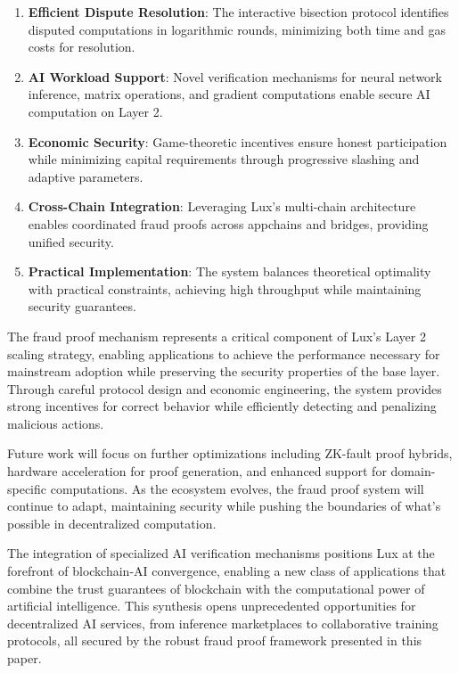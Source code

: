 \documentclass[11pt,a4paper]{article}
\theoremstyle{definition}
\begin{document}
\begin{enumerate}
    \item \textbf{Efficient Dispute Resolution}: The interactive bisection protocol identifies disputed computations in logarithmic rounds, minimizing both time and gas costs for resolution.
    
    \item \textbf{AI Workload Support}: Novel verification mechanisms for neural network inference, matrix operations, and gradient computations enable secure AI computation on Layer 2.
    
    \item \textbf{Economic Security}: Game-theoretic incentives ensure honest participation while minimizing capital requirements through progressive slashing and adaptive parameters.
    
    \item \textbf{Cross-Chain Integration}: Leveraging Lux's multi-chain architecture enables coordinated fraud proofs across appchains and bridges, providing unified security.
    
    \item \textbf{Practical Implementation}: The system balances theoretical optimality with practical constraints, achieving high throughput while maintaining security guarantees.
\end{enumerate}

The fraud proof mechanism represents a critical component of Lux's Layer 2 scaling strategy, enabling applications to achieve the performance necessary for mainstream adoption while preserving the security properties of the base layer. Through careful protocol design and economic engineering, the system provides strong incentives for correct behavior while efficiently detecting and penalizing malicious actions.

Future work will focus on further optimizations including ZK-fault proof hybrids, hardware acceleration for proof generation, and enhanced support for domain-specific computations. As the ecosystem evolves, the fraud proof system will continue to adapt, maintaining security while pushing the boundaries of what's possible in decentralized computation.

The integration of specialized AI verification mechanisms positions Lux at the forefront of blockchain-AI convergence, enabling a new class of applications that combine the trust guarantees of blockchain with the computational power of artificial intelligence. This synthesis opens unprecedented opportunities for decentralized AI services, from inference marketplaces to collaborative training protocols, all secured by the robust fraud proof framework presented in this paper.
\end{document}

